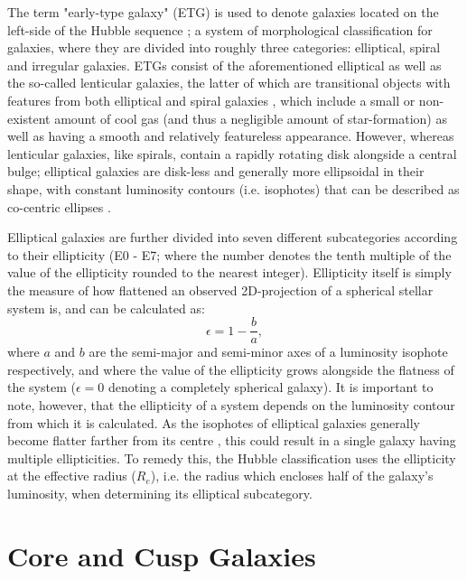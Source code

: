 \documentclass[english, oneside]{HYgradu}
\begin{document}
The term "early-type galaxy" (ETG) is used to denote galaxies located on the left-side of  the Hubble sequence \citep[defined by][]{Hubble1926}; a system of morphological classification for galaxies, where they are divided into roughly three categories: elliptical, spiral and irregular galaxies. ETGs consist of the aforementioned elliptical as well as the so-called lenticular galaxies, the latter of which are transitional objects with features from both elliptical and spiral galaxies \citep{BinneyTremaine}, which include a small or non-existent amount of cool gas (and thus a negligible amount of star-formation) as well as having a smooth and relatively featureless appearance. However, whereas lenticular galaxies, like spirals, contain a rapidly rotating disk alongside a central bulge; elliptical galaxies are disk-less and generally more ellipsoidal in their shape, with constant luminosity contours (i.e. isophotes) that can be described as co-centric ellipses \citep{BinneyTremaine}.

Elliptical galaxies are further divided into seven different subcategories according to their ellipticity (E0 - E7; where the number denotes the tenth multiple of the value of the ellipticity rounded to the nearest integer). Ellipticity itself is simply the measure of how flattened an observed 2D-projection of a spherical stellar system is, and can be calculated as:
\begin{equation}
\epsilon = 1 - \frac{b}{a},
\end{equation}
where $a$ and $b$ are the semi-major and semi-minor axes of a luminosity isophote respectively, and where the value of the ellipticity grows alongside the flatness of the system ($\epsilon = 0$ denoting a completely spherical galaxy). It is important to note, however, that the ellipticity of a system depends on the luminosity contour from which it is calculated. As the isophotes of elliptical galaxies generally become flatter farther from its centre \citep{BinneyTremaine}, this could result in a single galaxy having multiple ellipticities. To remedy this, the Hubble classification uses the ellipticity at the effective radius ($R_e$), i.e. the radius which encloses half of the galaxy's luminosity, when determining its elliptical subcategory.

\section{Core and Cusp Galaxies}
\end{document}
